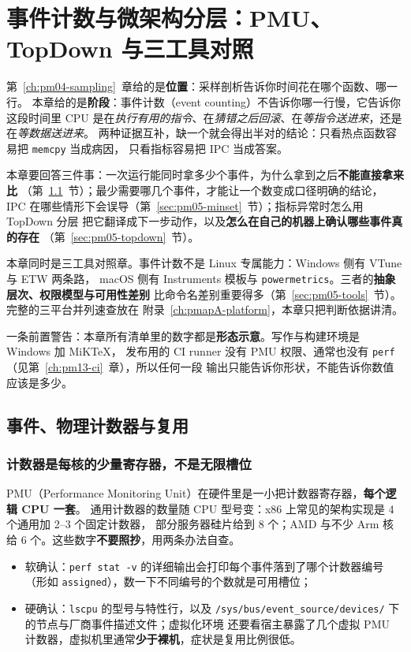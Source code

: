 \documentclass[12pt,a4paper,fontset=fandol]{ctexbook}
\newcommand{\Tp}[1]{\texttt{#1}}
\newcommand{\Bk}{\discretionary{}{}{}}
\newcommand{\Mx}[1]{\textsf{#1}}
\begin{document}
\chapter{事件计数与微架构分层：PMU、TopDown 与三工具对照}
\label{ch:pm05-events}

第~\ref{ch:pm04-sampling}~章给的是\textbf{位置}：采样剖析告诉你时间花在哪个函数、哪一行。
本章给的是\textbf{阶段}：事件计数（event counting）不告诉你哪一行慢，它告诉你这段时间里 CPU
是在\emph{执行有用的指令}、在\emph{猜错之后回滚}、在\emph{等指令送进来}，还是在\emph{等数据送进来}。
两种证据互补，缺一个就会得出半对的结论：只看热点函数容易把 \Tp{memcpy} 当成病因，
只看指标容易把 \Mx{IPC} 当成答案。

本章要回答三件事：一次运行能同时拿多少个事件，为什么拿到之后\textbf{不能直接拿来比}
（第~\ref{sec:pm05-counters}~节）；最少需要哪几个事件，才能让一个数变成口径明确的结论，
\Mx{IPC} 在哪些情形下会误导（第~\ref{sec:pm05-minset}~节）；指标异常时怎么用 TopDown 分层
把它翻译成下一步动作，以及\textbf{怎么在自己的机器上确认哪些事件真的存在}
（第~\ref{sec:pm05-topdown}~节）。

本章同时是三工具对照章。事件计数不是 Linux 专属能力：Windows 侧有 VTune 与 ETW 两条路，
macOS 侧有 Instruments 模板与 \Tp{powermetrics}。三者的\textbf{抽象层次、权限模型与可用性差别}
比命令名差别重要得多（第~\ref{sec:pm05-tools}~节）。完整的三平台并列速查放在
附录~\ref{ch:pmapA-platform}，本章只把判断依据讲清。

一条前置警告：本章所有清单里的数字都是\textbf{形态示意}。写作与构建环境是 Windows 加 MiKTeX，
发布用的 CI runner 没有 PMU 权限、通常也没有 \Tp{perf}（见第~\ref{ch:pm13-ci}~章），所以任何一段
输出只能告诉你形状，不能告诉你数值应该是多少。

\section{事件、物理计数器与复用}
\label{sec:pm05-counters}

\subsection*{计数器是每核的少量寄存器，不是无限槽位}

PMU（Performance Monitoring Unit）在硬件里是一小把计数器寄存器，\textbf{每个逻辑 CPU 一套}。
通用计数器的数量随 CPU 型号变：x86 上常见的架构实现是 4 个通用加 2--3 个固定计数器，
部分服务器硅片给到 8 个；AMD 与不少 Arm 核给 6 个。这些数字\textbf{不要照抄}，用两条办法自查。

\begin{itemize}
  \item 软确认：\Tp{perf stat -v} 的详细输出会打印每个事件落到了哪个计数器编号
        （形如 \Tp{assigned}），数一下不同编号的个数就是可用槽位；
  \item 硬确认：\Tp{lscpu} 的型号与特性行，以及
        \Tp{/sys/bus/{\Bk}event\_source{\Bk}/devices{\Bk}/} 下的节点与厂商事件描述文件；虚拟化环境
        还要看宿主暴露了几个虚拟 PMU 计数器，虚拟机里通常\textbf{少于裸机}，症状是复用比例很低。
\end{itemize}
\end{document}
